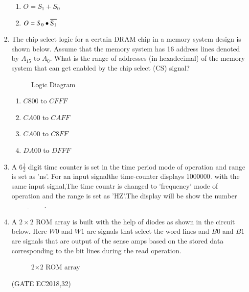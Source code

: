 \begin{enumerate}
\begin{enumerate}
            \item  $O=S_1 + S_0$
            
            \item $O=S_0\bullet\overline{\rm S _1}$
 \end{enumerate}
\item  The chip select logic for a certain DRAM chip in a memory system design is shown below. Assume that the memory system has 16 address lines denoted by ${A_{15}}$ to ${A_0}$. What is the range of addresses (in hexadecimal) of the memory system that can get enabled by the chip select (CS) signal?
\hfill{}

\begin{figure}[H]

\caption{Logic Diagram}
\label{fig:figure14}
\end{figure}

\begin{enumerate}
\item ${C800}$ to ${CFFF}$
\item ${CA00}$ to ${CAFF}$
\item ${CA00}$ to ${C8FF}$
\item ${DA00}$ to ${DFFF}$
\end{enumerate}  


\item A $6{\frac{1}{2}}$ digit time counter is set in the time period mode of operation and range is set as 'ns'. For an input signalthe time-counter displays $1000000$. with the same input signal,The time countr is changed to 'frequency' mode of operation and the range is set as 'HZ'.The display will be show the number$\underline{\hspace{2cm}}$.
\hfill{}


\item  A $2\times2$ ROM array is built with the help of diodes as shown in the circuit below. Here $W0$ and $W1$ are signals that select the word lines and $B0$ and $B1$ are signals that are output of the sense amps based on the stored data corresponding to the bit lines during the read operation.

\begin{figure}[H]
        \centering
        
        \caption{ 2×2 ROM array}
     
\end{figure}
	\hfill(GATE EC2018,32)


\end{enumerate}
